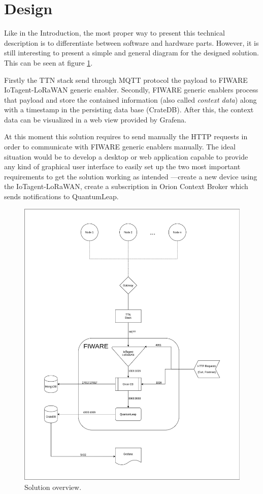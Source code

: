 \documentclass[11pt,a4paper,dvipsnames,twoside]{article}
\begin{document}
\clearpage{\pagestyle{empty}\cleardoublepage}\thispagestyle{plain} %
\section{Design}\thispagestyle{plain}
Like in the Introduction, the most proper way to present this technical description is to differentiate between software and hardware parts. However, it is still interesting to present a simple and general diagram for the designed solution. This can be seen at figure \ref{fig:GenView}. 

Firstly the TTN stack send through MQTT protocol the payload to FIWARE IoTagent-LoRaWAN generic enabler. Secondly, FIWARE generic enablers process that payload and store the contained information (also called \textit{context data}) along with a timestamp in the persisting data base (CrateDB). After this, the context data can be visualized in a web view provided by Grafena. 

At this moment this solution requires to send manually the HTTP requests in order to communicate with FIWARE generic enablers manually. The ideal situation would be to develop a desktop or web application capable to provide any kind of graphical user interface to easily set up the two most important requirements to get the solution working as intended ---create a new device using the IoTagent-LoRaWAN, create a subscription in Orion Context Broker which sends notifications to QuantumLeap.

\begin{figure}[htp]
  \centering
  \includegraphics[width=\textwidth]{../schemes/main_scheme_tbg.png}
  \caption{Solution overview.}
  \label{fig:GenView}
\end{figure}
\end{document}
